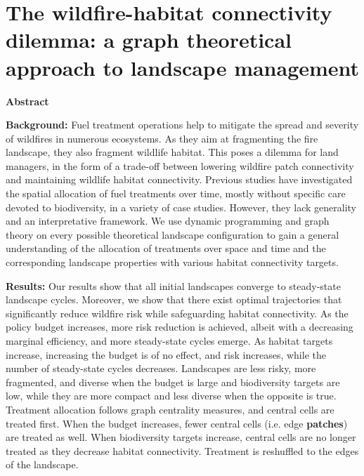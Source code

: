 \chapter{The wildfire-habitat connectivity dilemma: a graph theoretical approach to landscape management}

\begin{center}
\textbf{Abstract}\par
    \vspace*{.2cm}
    \noindent
    \begin{minipage}{0.9\textwidth}
	\singlespacing
\textbf{Background:} Fuel treatment operations help to mitigate the spread and severity of wildfires in numerous ecosystems. As they aim at fragmenting the fire landscape, they also fragment wildlife habitat. This poses a dilemma for land managers, in the form of a trade-off between lowering wildfire patch connectivity and maintaining wildlife habitat connectivity. Previous studies have investigated the spatial allocation of fuel treatments over time, mostly without specific care devoted to biodiversity, in a variety of case studies. However, they lack generality and an interpretative framework. We use dynamic programming and graph theory on every possible theoretical landscape configuration to gain a general understanding of the allocation of treatments over space and time and the corresponding landscape properties with various habitat connectivity targets. 
 
\textbf{Results:} Our results show that all initial landscapes converge to steady-state landscape cycles. Moreover, we show that there exist optimal trajectories that significantly reduce wildfire risk while safeguarding habitat connectivity. As the policy budget increases, more risk reduction is achieved, albeit with a decreasing marginal efficiency, and more steady-state cycles emerge. As habitat targets increase, increasing the budget is of no effect, and risk increases, while the number of steady-state cycles decreases. Landscapes are less risky, more fragmented, and diverse when the budget is large and biodiversity targets are low, while they are more compact and less diverse when the opposite is true. Treatment allocation follows graph centrality measures, and central cells are treated first. When the budget increases, fewer central cells (i.e. edge \textbf{patches}) are treated as well. When biodiversity targets increase, central cells are no longer treated as they decrease habitat connectivity. Treatment is reshuffled to the edges of the landscape.



\end{minipage}
\end{center}

